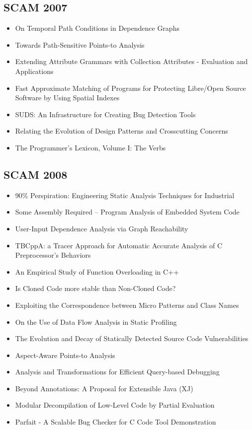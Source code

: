 \subsection{SCAM 2007}

{\small
\begin{itemize}[itemsep=-1ex]
  \item On Temporal Path Conditions in Dependence Graphs
  \item Towards Path-Sensitive Points-to Analysis
  \item Extending Attribute Grammars with Collection Attributes - Evaluation and Applications
  \item Fast Approximate Matching of Programs for Protecting Libre/Open Source Software by Using Spatial Indexes
  \item SUDS: An Infrastructure for Creating Bug Detection Tools
  \item Relating the Evolution of Design Patterns and Crosscutting Concerns
  \item The Programmer’s Lexicon, Volume I: The Verbs
\end{itemize}
}

\subsection{SCAM 2008}

{\small
\begin{itemize}[itemsep=-1ex]
  \item 90\% Perspiration: Engineering Static Analysis Techniques for Industrial
  \item Some Assembly Required – Program Analysis of Embedded System Code
  \item User-Input Dependence Analysis via Graph Reachability
  \item TBCppA: a Tracer Approach for Automatic Accurate Analysis of C Preprocessor’s Behaviors
  \item An Empirical Study of Function Overloading in C++
  \item Is Cloned Code more stable than Non-Cloned Code?
  \item Exploiting the Correspondence between Micro Patterns and Class Names
  \item On the Use of Data Flow Analysis in Static Profiling
  \item The Evolution and Decay of Statically Detected Source Code Vulnerabilities
  \item Aspect-Aware Points-to Analysis
  \item Analysis and Transformations for Efficient Query-based Debugging
  \item Beyond Annotations: A Proposal for Extensible Java (XJ)
  \item Modular Decompilation of Low-Level Code by Partial Evaluation
  \item Parfait - A Scalable Bug Checker for C Code Tool Demonstration
\end{itemize}
}


